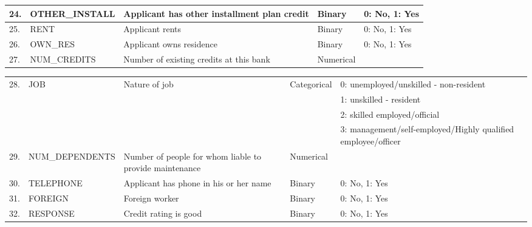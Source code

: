 \begin{table}
\begin{tabular}{|p{0.6cm}|p{2.6cm}|p{5cm}|p{2cm}|p{4.5cm}|}
	{\tiny 24.} & {\tiny OTHER\_INSTALL} & {\tiny Applicant has other installment plan credit} & {\tiny Binary} & {\tiny 0: No, 1: Yes} \\ \hline
	{\tiny 25.} & {\tiny RENT} & {\tiny Applicant rents} & {\tiny Binary} & {\tiny 0: No, 1: Yes} \\ \hline
	{\tiny 26.} & {\tiny OWN\_RES }& {\tiny Applicant owns residence} & {\tiny Binary} & {\tiny 0: No, 1: Yes}\\ \hline
	{\tiny 27.} &{\tiny  NUM\_CREDITS} & {\tiny Number of existing credits at this bank} & {\tiny Numerical} & \\ \hline
	\end{tabular}
\end{table}	
\begin{table}[]
	\begin{tabular}{|p{0.6cm}|p{2.6cm}|p{5cm}|p{2cm}|p{4.5cm}|}
		\hline
		{\tiny 28.} & {\tiny JOB} & {\tiny Nature of job} & {\tiny Categorical} & {\tiny 0: unemployed/unskilled - non-resident} \\
		&&&& {\tiny 1: unskilled - resident }\\ 
		&&&& {\tiny 2: skilled employed/official} \\
		&&&& {\tiny 3: management/self-employed/Highly qualified employee/officer} \\ \hline
	{\tiny 29.} & {\tiny NUM\_DEPENDENTS} & {\tiny Number of people for whom liable to provide maintenance} & {\tiny Numerical} &\\ \hline
	{\tiny 30. }& {\tiny TELEPHONE} &{\tiny  Applicant has phone in his or her name} & {\tiny Binary} & {\tiny 0: No, 1: Yes} \\ \hline
	{\tiny 31.} & {\tiny FOREIGN} &{\tiny  Foreign worker} & {\tiny Binary} & {\tiny 0: No, 1: Yes} \\ \hline
{\tiny 	32.} & {\tiny RESPONSE} & {\tiny Credit rating is good} & {\tiny Binary} & {\tiny 0: No, 1: Yes} \\ \hline
	\end{tabular}
\end{table}